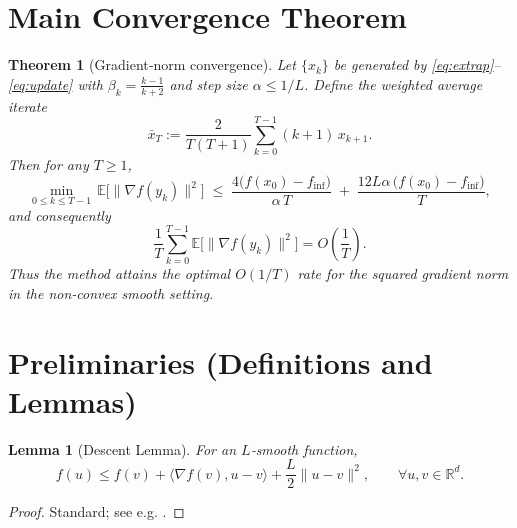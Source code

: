 \documentclass{article}
\newtheorem{theorem}{Theorem}
\newtheorem{lemma}{Lemma}
\newcommand{\E}{\mathbb{E}}
\newcommand{\R}{\mathbb{R}}
\begin{document}
\section*{Main Convergence Theorem}
\begin{theorem}[Gradient‑norm convergence]\label{thm:main}
Let $\{x_k\}$ be generated by \eqref{eq:extrap}–\eqref{eq:update} with
$\beta_k=\frac{k-1}{k+2}$ and step size $\alpha\le 1/L$.
Define the weighted average iterate
\[
\bar{x}_T:=\frac{2}{T(T+1)}\sum_{k=0}^{T-1}(k+1)\,x_{k+1}.
\]
Then for any $T\ge 1$,
\[
\min_{0\le k\le T-1}\,
\E\!\bigl[\|\nabla f(y_k)\|^2\bigr]
\;\le\;
\frac{4\bigl(f(x_0)-f_{\inf}\bigr)}{\alpha\,T}
\;+\;
\frac{12L\alpha\,\bigl(f(x_0)-f_{\inf}\bigr)}{T},
\tag{1}
\]
and consequently
\[
\frac{1}{T}\sum_{k=0}^{T-1}\E\!\bigl[\|\nabla f(y_k)\|^2\bigr]
= O\!\left(\frac{1}{T}\right).
\tag{2}
\]
Thus the method attains the optimal $O(1/T)$ rate for the squared gradient
norm in the non‑convex smooth setting.
\end{theorem}

\section*{Preliminaries (Definitions and Lemmas)}
\begin{lemma}[Descent Lemma]\label{lem:descent}
For an $L$‑smooth function,
\[
f(u)\le f(v)+\langle \nabla f(v),u-v\rangle
          +\frac{L}{2}\|u-v\|^2,
\qquad\forall u,v\in\R^d .
\]
\end{lemma}
\begin{proof}
Standard; see e.g. \cite{Nesterov2004}.
\end{proof}
\end{document}

